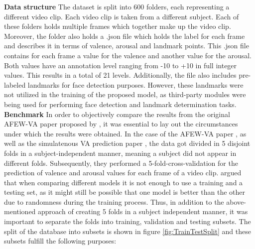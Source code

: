 \newline\newline
\textbf{Data structure}\newline
The dataset is split into 600 folders, each representing a different video clip. Each video clip is taken from a different subject. Each of these folders holds multiple frames which together make up the video clip. Moreover, the folder also holds a .json file which holds the label for each frame and describes it in terms of valence, arousal and landmark points.
\newline\newline
This .json file contains for each frame a value for the valence and another value for the arousal. Both values have an annotation level ranging from -10 to +10 in full integer values. This results in a total of 21 levels.\citep{Kossaifi:2017:AFEW-VADatabase} Additionally, the file also includes pre-labeled landmarks for face detection purposes. However, these landmarks were not utilized in the training of the proposed model, as third-party modules were being used for performing face detection and landmark determination tasks.
\newline\newline
\textbf{Benchmark}
\newline
In order to objectively compare the results from the original AFEW-VA paper proposed by \citet{Kossaifi:2017:AFEW-VADatabase}, it was essential to lay out the circumstances under which the results were obtained. In the case of the AFEW-VA paper \citep{Kossaifi:2017:AFEW-VADatabase}, as well as the simulatenous VA prediction paper \citep{Handrich:2020:SimultaneousPredVA}, the data got divided in 5 disjoint folds in a subject-independent manner, meaning a subject did not appear in different folds. Subsequently, they performed a 5-fold-cross-validation for the prediction of valence and arousal values for each frame of a video clip.\citep{Kossaifi:2017:AFEW-VADatabase}
\newline\newline
\citet{Roehrich:2020:TrainValidateTest} argued that when comparing different models it is not enough to use a training and a testing set, as it might still be possible that one model is better than the other due to randomness during the training process. Thus, in addition to the above-mentioned approach of creating 5 folds in a subject independent manner, it was important to separate the folds into training, validation and testing subsets. The split of the database into subsets is shown in figure \ref{fig:TrainTestSplit} and these subsets fulfill the following purposes:

